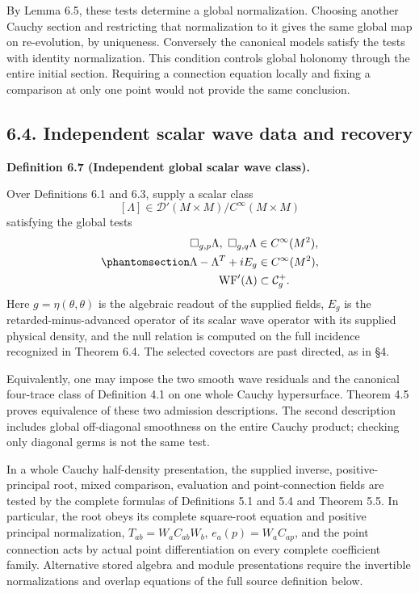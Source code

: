 \documentclass[
  english,
  11pt,
  reqno]{amsart}
\makeatletter
\newcommand{\paperdisplaynext}{%
  \let\paper@savedstartsection\@startsection
  \def\@startsection##1##2##3##4##5##6{%
    \let\@startsection\paper@savedstartsection
    \@tempskipa ##5\relax
    \ifdim\@tempskipa<\z@
      \def\paper@afterskip{.35\baselineskip}%
    \else
      \def\paper@afterskip{##5}%
    \fi
    \@startsection{##1}{##2}{##3}{##4}{\paper@afterskip}{##6}}}
\newcommand{\paperdisplaysection}{\paperdisplaynext\subsection}
\newcommand{\pandocstatementheading}[1]{%
  \par\if@nobreak\else
    \addpenalty{\@beginparpenalty}%
    \addvspace{.5\baselineskip plus .2\baselineskip minus .2\baselineskip}%
  \fi
  {\normalfont\bfseries #1\par}%
  \nobreak\@afterindenttrue\@afterheading
}
\makeatother
\begin{document}
By Lemma 6.5, these tests determine a global normalization. Choosing
another Cauchy section and restricting that normalization to it gives
the same global map on re-evolution, by uniqueness. Conversely the
canonical models satisfy the tests with identity normalization. This
condition controls global holonomy through the entire initial section.
Requiring a connection equation locally and fixing a comparison at only
one point would not provide the same conclusion.

\protect{}\label{sec:global-independent-scalar-admission}
\paperdisplaysection{6.4. Independent scalar wave data and
recovery}\label{independent-scalar-wave-data-and-recovery}
\pandocstatementheading{\protect{}\label{def:global-independent-scalar-wave}Definition 6.7 (Independent global scalar wave class).}

Over Definitions 6.1 and 6.3, supply a scalar class \[
[\Lambda]\in\mathcal D'(M\times M)/C^\infty(M\times M)
\] satisfying the global tests
\begin{equation}\protect\phantomsection\label{eq:global-independent-scalar-tests}{\begin{gathered}
\Box_{g,p}\Lambda,\ \Box_{g,q}\Lambda\in C^\infty(M^2), \\
\Lambda-\Lambda^T+iE_g\in C^\infty(M^2), \\
\operatorname{WF}'(\Lambda)\subset\mathcal C_g^+.
\end{gathered}}\end{equation} Here \(g=\eta(\theta,\theta)\) is the algebraic readout
of the supplied fields, \(E_g\) is the retarded-minus-advanced operator
of its scalar wave operator with its supplied physical density, and the
null relation is computed on the full incidence recognized in Theorem
6.4. The selected covectors are past directed, as in §4.

Equivalently, one may impose the two smooth wave residuals and the
canonical four-trace class of Definition 4.1 on one whole Cauchy
hypersurface. Theorem 4.5 proves equivalence of these two admission
descriptions. The second description includes global off-diagonal
smoothness on the entire Cauchy product; checking only diagonal germs is
not the same test.

In a whole Cauchy half-density presentation, the supplied inverse,
positive-principal root, mixed comparison, evaluation and
point-connection fields are tested by the complete formulas of
Definitions 5.1 and 5.4 and Theorem 5.5. In particular, the root obeys
its complete square-root equation and positive principal normalization,
\(T_{ab}=W_aC_{ab}W_b\), \(e_a(p)=W_aC_{ap}\), and the point connection
acts by actual point differentiation on every complete coefficient
family. Alternative stored algebra and module presentations require the
invertible normalizations and overlap equations of the full source
definition below.
\end{document}
